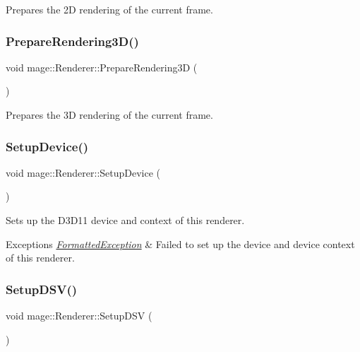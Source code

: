 Prepares the 2D rendering of the current frame. \hypertarget{classmage_1_1_renderer_a9c76ba66a275c0d74f250955e7781f77}{}\label{classmage_1_1_renderer_a9c76ba66a275c0d74f250955e7781f77} 
\subsubsection{\texorpdfstring{Prepare\+Rendering3\+D()}{PrepareRendering3D()}}
{\footnotesize\ttfamily void mage\+::\+Renderer\+::\+Prepare\+Rendering3D (\begin{DoxyParamCaption}{ }\end{DoxyParamCaption})}

Prepares the 3D rendering of the current frame. \hypertarget{classmage_1_1_renderer_aedf5e2e3f73d3d05c09c5fc9f8ac06c3}{}\label{classmage_1_1_renderer_aedf5e2e3f73d3d05c09c5fc9f8ac06c3} 
\subsubsection{\texorpdfstring{Setup\+Device()}{SetupDevice()}}
{\footnotesize\ttfamily void mage\+::\+Renderer\+::\+Setup\+Device (\begin{DoxyParamCaption}{ }\end{DoxyParamCaption})\hspace{0.3cm}{\ttfamily [private]}}

Sets up the D3\+D11 device and context of this renderer.


\begin{DoxyExceptions}{Exceptions}
{\em \hyperlink{structmage_1_1_formatted_exception}{Formatted\+Exception}} & Failed to set up the device and device context of this renderer. \\
\hline
\end{DoxyExceptions}
\hypertarget{classmage_1_1_renderer_a49dc4b2353ee4e851c575f30ec1dcf22}{}\label{classmage_1_1_renderer_a49dc4b2353ee4e851c575f30ec1dcf22} 
\subsubsection{\texorpdfstring{Setup\+D\+S\+V()}{SetupDSV()}}
{\footnotesize\ttfamily void mage\+::\+Renderer\+::\+Setup\+D\+SV (\begin{DoxyParamCaption}{ }\end{DoxyParamCaption})\hspace{0.3cm}{\ttfamily [private]}}

